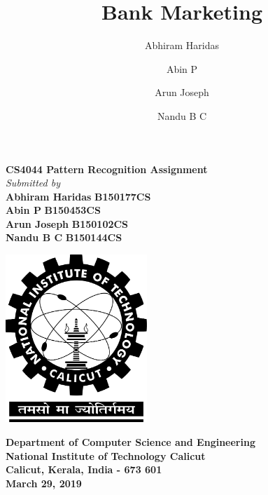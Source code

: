 \documentclass[twocolumn]{article}
\date{}
\begin{document}
\begin{titlepage}
\begin{center}
\vspace{1cm}

\Large
\textbf{CS4044 Pattern Recognition Assignment}\\
\vspace{1cm}
\emph{Submitted by}\\        
\vspace{0.5cm}
\large
\textbf{Abhiram Haridas} \hspace{0.75cm}    
\textbf{B150177CS}\\
\textbf{Abin P} \hspace{0.75cm}    
\textbf{B150453CS}\\
\textbf{Arun Joseph} \hspace{0.75cm}    
\textbf{B150102CS}\\
\textbf{Nandu B C} \hspace{0.75cm}
\textbf{B150144CS}\\

\vspace{.5cm}
\begin{center}
 \includegraphics[width=0.4\textwidth]{nitc-logo.png}
\end{center}
\vspace{0.8cm}
\textbf{Department of Computer Science and Engineering}\\
\textbf{National Institute of Technology Calicut}\\
\textbf{Calicut, Kerala, India - 673 601}\\
\vspace{0.8cm}
\textbf{March 29, 2019}
\end{center}
\end{titlepage}

\title{\textbf{Bank Marketing}}

\author{Abhiram Haridas \and Abin P \and Arun Joseph \and Nandu B C}
\end{document}
